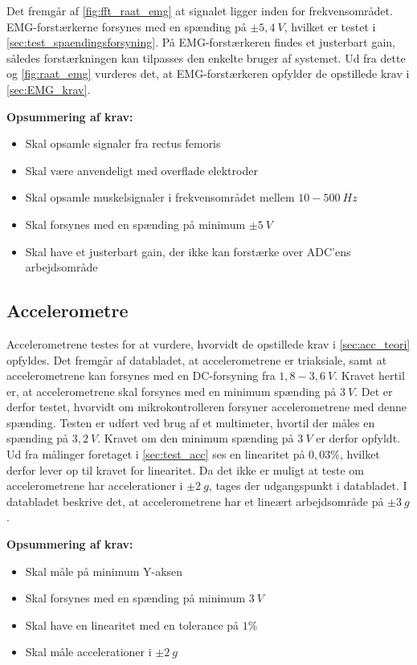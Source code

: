 Det fremgår af \autoref{fig:fft_raat_emg} at signalet ligger inden for frekvensområdet. 
EMG-forstærkerne forsynes med en spænding på $\pm 5,4~V$, hvilket er testet i \autoref{sec:test_spaendingsforsyning}.
På EMG-forstærkeren findes et justerbart gain, således forstærkningen kan tilpasses den enkelte bruger af systemet. Ud fra dette og \autoref{fig:raat_emg} vurderes det, at EMG-forstærkeren opfylder de opstillede krav i \autoref{sec:EMG_krav}.

\vspace{3mm}
\textbf{Opsummering af krav:}
\begin{itemize}
\item[\text{\sffamily \checkmark}] Skal opsamle signaler fra rectus femoris
\item[\text{\sffamily \checkmark}] Skal være anvendeligt med overflade elektroder
\item[\text{\sffamily \checkmark}] Skal opsamle muskelsignaler i frekvensområdet mellem $10-500~Hz$
\item[\text{\sffamily \checkmark}] Skal forsynes med en spænding på minimum $\pm5~V$
\item[\text{\sffamily \checkmark}] Skal have et justerbart gain, der ikke kan forstærke over ADC'ens arbejdsområde
\end{itemize}


\subsection{Accelerometre}

Accelerometrene testes for at vurdere, hvorvidt de opstillede krav i \autoref{sec:acc_teori} opfyldes. 
Det fremgår af databladet, at accelerometrene er triaksiale, samt at accelerometrene kan forsynes med en DC-forsyning fra $1,8-3,6~V$. Kravet hertil er, at accelerometrene skal forsynes med en minimum spænding på $3~V$. Det er derfor testet, hvorvidt om mikrokontrolleren forsyner accelerometrene med denne spænding. Testen er udført ved brug af et multimeter, hvortil der måles en spænding på $3,2~V$. Kravet om den minimum spænding på $3~V$ er derfor opfyldt.
Ud fra målinger foretaget i \autoref{sec:test_acc} ses en linearitet på $0,03\%$, hvilket derfor lever op til kravet for linearitet. Da det ikke er muligt at teste om accelerometrene har accelerationer i $\pm2~g$, tages der udgangspunkt i databladet. I databladet beskrive det, at accelerometrene har et lineært arbejdsområde på $\pm 3~g$.

\vspace{3mm}
\textbf{Opsummering af krav:}
\begin{itemize}
\item[\text{\sffamily \checkmark}] Skal måle på minimum Y-aksen
\item[\text{\sffamily \checkmark}] Skal forsynes med en spænding på minimum $3~V$
\item[\text{\sffamily \checkmark}] Skal have en linearitet med en tolerance på $1\%$
\item[\text{\sffamily \checkmark}] Skal måle accelerationer i $\pm2~g$
\end{itemize}

